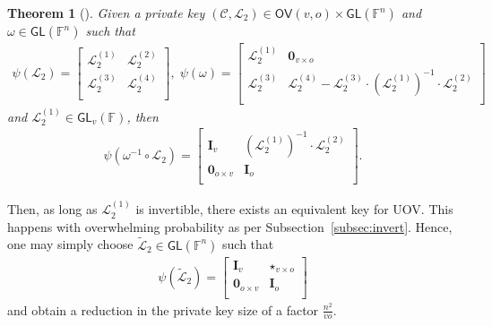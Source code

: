 \documentclass[12pt, a4paper, oneside]{memoir}
\newtheorem{theorem}{Theorem}[section]
\theoremstyle{definition}
\begin{document}
\begin{theorem}[{\cite[Theorem 2]{Beullens:201706}}]
  Given a private key $(\mathcal{C}, \mathcal{L}_{2}) \in \mathsf{OV}(v, o) \times \mathsf{GL}(\mathbb{F}^{n})$ and $\omega \in \mathsf{GL}(\mathbb{F}^{n})$ such that
  \begin{align}
    \psi(\mathcal{L}_{2}) =
    \begin{bmatrix}
      \mathcal{L}_{2}^{(1)} & \mathcal{L}_{2}^{(2)} \\
      \mathcal{L}_{2}^{(3)} & \mathcal{L}_{2}^{(4)} \\
    \end{bmatrix},\;
    \psi(\omega) =
    \begin{bmatrix}
      \mathcal{L}_{2}^{(1)} & \mathbf{0}_{v \times o} \\
      \mathcal{L}_{2}^{(3)} & \mathcal{L}_{2}^{(4)} -\mathcal{L}_{2}^{(3)} \cdot (\mathcal{L}_{2}^{(1)})^{-1} \cdot \mathcal{L}_{2}^{(2)} \\
    \end{bmatrix}
  \end{align}
  and $\mathcal{L}_{2}^{(1)} \in \mathsf{GL}_{v}(\mathbb{F})$, then
  \begin{align}
    \psi(\omega^{-1} \circ \mathcal{L}_{2}) = \begin{bmatrix}
      \mathbf{I}_{v} & (\mathcal{L}_{2}^{(1)})^{-1} \cdot \mathcal{L}_{2}^{(2)} \\
      \mathbf{0}_{o \times v} & \mathbf{I}_{o} \\
    \end{bmatrix}.
  \end{align}
\end{theorem}

Then, as long as $\mathcal{L}_{2}^{(1)}$ is invertible, there exists an equivalent key for UOV. This happens with overwhelming probability as per Subsection~\ref{subsec:invert}. Hence, one may simply choose $\widetilde{\mathcal{L}}_{2} \in \mathsf{GL}(\mathbb{F}^{n})$ such that
\begin{align}
  \psi(\widetilde{\mathcal{L}}_{2}) =
  \begin{bmatrix}
    \mathbf{I}_{v}          & \star_{v \times o} \\
    \mathbf{0}_{o \times v} & \mathbf{I}_{o} \\
  \end{bmatrix}
\end{align}
and obtain a reduction in the private key size of a factor $\frac{n^{2}}{v o}$.
\end{document}

